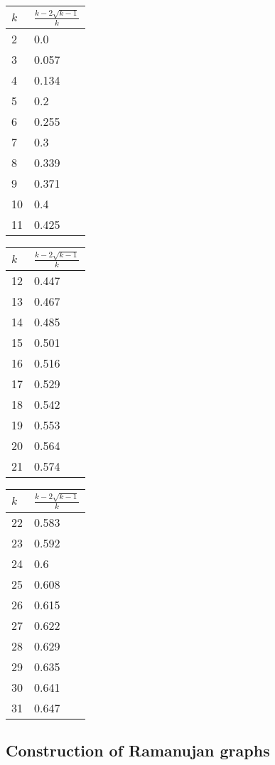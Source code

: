 \begin{center}
	\begin{tabular}{ p{0.5cm}|p{1.3cm}}
		$k$ & $\frac{k - 2\sqrt{k-1}}{k}$ \\
		\hline
		2 & 0.0 \\
		3 & 0.057 \\
		4 & 0.134 \\
		5 & 0.2 \\
		6 & 0.255 \\
		7 & 0.3 \\
		8 & 0.339 \\
		9 & 0.371 \\
		10 & 0.4 \\
		11 & 0.425 \\
	\end{tabular}
	\hspace{2em}
	\begin{tabular}{ p{0.5cm}|p{1.3cm}}
		$k$ & $\frac{k - 2\sqrt{k-1}}{k}$ \\
		\hline
		12 & 0.447 \\
		13 & 0.467 \\
		14 & 0.485 \\
		15 & 0.501 \\
		16 & 0.516 \\
		17 & 0.529 \\
		18 & 0.542 \\
		19 & 0.553 \\
		20 & 0.564 \\
		21 & 0.574 \\
	\end{tabular}
	\hspace{2em}
	\begin{tabular}{ p{0.5cm}|p{1.3cm}}
	$k$ & $\frac{k - 2\sqrt{k-1}}{k}$ \\
	\hline
	22 & 0.583 \\
	23 & 0.592 \\
	24 & 0.6 \\
	25 & 0.608 \\
	26 & 0.615 \\
	27 & 0.622 \\
	28 & 0.629 \\
	29 & 0.635 \\
	30 & 0.641 \\
	31 & 0.647 
	\end{tabular}
\end{center}

\subsection{Construction of Ramanujan graphs}

